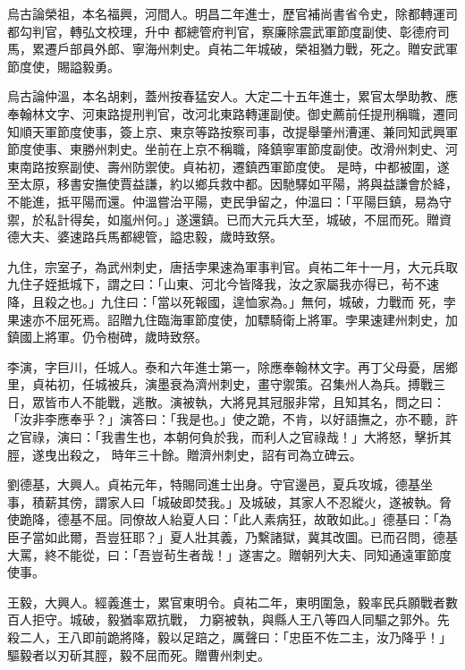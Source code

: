 \begin{pinyinscope}
 烏古論榮祖，本名福興，河間人。明昌二年進士，歷官補尚書省令史，除都轉運司都勾判官，轉弘文校理，升中
 都總管府判官，察廉除震武軍節度副使、彰德府司馬，累遷戶部員外郎、寧海州刺史。貞祐二年城破，榮祖猶力戰，死之。贈安武軍節度使，賜謚毅勇。



 烏古論仲溫，本名胡剌，蓋州按春猛安人。大定二十五年進士，累官太學助教、應奉翰林文字、河東路提刑判官，改河北東路轉運副使。御史薦前任提刑稱職，遷同知順天軍節度使事，簽上京、東京等路按察司事，改提舉肇州漕運、兼同知武興軍節度使事、東勝州刺史。坐前在上京不稱職，降鎮寧軍節度副使。改滑州刺史、河東南路按察副使、壽州防禦使。貞祐初，遷鎮西軍節度使。
 是時，中都被圍，遂至太原，移書安撫使賈益謙，約以鄉兵救中都。因馳驛如平陽，將與益謙會於絳，不能進，抵平陽而還。仲溫嘗治平陽，吏民爭留之，仲溫曰：「平陽巨鎮，易為守禦，於私計得矣，如嵐州何。」遂還鎮。已而大元兵大至，城破，不屈而死。贈資德大夫、婆速路兵馬都總管，謚忠毅，歲時致祭。



 九住，宗室子，為武州刺史，唐括孛果速為軍事判官。貞祐二年十一月，大元兵取九住子姪抵城下，謂之曰：「山東、河北今皆降我，汝之家屬我亦得已，茍不速降，且殺之也。」九住曰：「當以死報國，遑恤家為。」無何，城破，力戰而
 死，孛果速亦不屈死焉。詔贈九住臨海軍節度使，加驃騎衛上將軍。孛果速建州刺史，加鎮國上將軍。仍令樹碑，歲時致祭。



 李演，字巨川，任城人。泰和六年進士第一，除應奉翰林文字。再丁父母憂，居鄉里，貞祐初，任城被兵，演墨衰為濟州刺史，畫守禦策。召集州人為兵。搏戰三日，眾皆市人不能戰，逃散。演被執，大將見其冠服非常，且知其名，問之曰：「汝非李應奉乎？」演答曰：「我是也。」使之跪，不肯，以好語撫之，亦不聽，許之官祿，演曰：「我書生也，本朝何負於我，而利人之官祿哉！」大將怒，擊折其脛，遂曳出殺之，
 時年三十餘。贈濟州刺史，詔有司為立碑云。



 劉德基，大興人。貞祐元年，特賜同進士出身。守官邊邑，夏兵攻城，德基坐事，積薪其傍，謂家人曰「城破即焚我。」及城破，其家人不忍縱火，遂被執。脅使跪降，德基不屈。同僚故人紿夏人曰：「此人素病狂，故敢如此。」德基曰：「為臣子當如此爾，吾豈狂耶？」夏人壯其義，乃繫諸獄，冀其改圖。已而召問，德基大罵，終不能從，曰：「吾豈茍生者哉！」遂害之。贈朝列大夫、同知通遠軍節度使事。



 王毅，大興人。經義進士，累官東明令。貞祐二年，東明圍急，毅率民兵願戰者數百人拒守。城破，毅猶率眾抗戰，
 力窮被執，與縣人王八等四人同驅之郭外。先殺二人，王八即前跪將降，毅以足踣之，厲聲曰：「忠臣不佐二主，汝乃降乎！」驅毅者以刃斫其脛，毅不屈而死。贈曹州刺史。




\end{pinyinscope}
